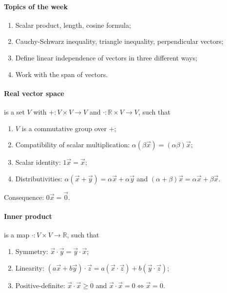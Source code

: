 \documentclass{article}
\begin{document}
\paragraph{Topics of the week}

\begin{enumerate}
    \item Scalar product, length, cosine formula;
    \item Cauchy-Schwarz inequality, triangle inequality, perpendicular vectors;
    \item Define linear independence of vectors in three different ways;
    \item Work with the span of vectors.
\end{enumerate}

\paragraph{Real vector space} is a set $V$ with $+ : V \times V \to V$ and $\cdot : \mathbb R \times V \to V$, such that

\begin{enumerate}
    \item $V$ is a commutative group over $+$;
    \item Compatibility of scalar multiplication: $\alpha (\beta \vec x) = (\alpha \beta) \vec x$;
    \item Scalar identity: $1 \vec x = \vec x$;
    \item Distributivities: $\alpha(\vec x + \vec y) = \alpha \vec x + \alpha \vec y$ and $(\alpha + \beta) \vec x = \alpha \vec x + \beta \vec x$.
\end{enumerate}

Consequence: $0 \vec x = \vec 0$.

\paragraph{Inner product} is a map $\cdot : V \times V \to \mathbb R$, such that
\begin{enumerate}
    \item Symmetry: $\vec x \cdot \vec y = \vec y \cdot \vec x$;
    \item Linearity: $(a\vec x + b\vec y) \cdot \vec z = a (\vec x \cdot \vec z) + b (\vec y \cdot \vec z)$;
    \item Positive-definite: $\vec x \cdot \vec x \geq 0$ and $\vec x \cdot \vec x = 0 \iff \vec x = 0$.
\end{enumerate}
\end{document}
